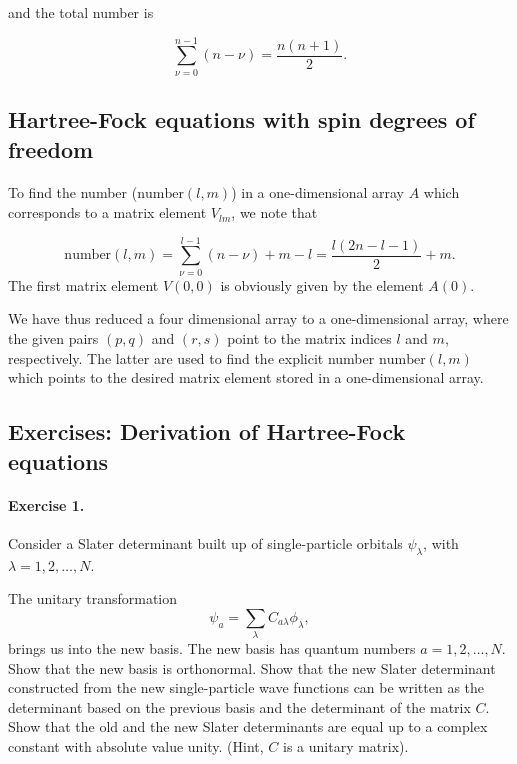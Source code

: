 \documentclass[%
twoside,                 %
final,                   %
10pt]{article}
\begin{document}
\noindent
and the total number is

\begin{equation*}
\sum_{\nu =0}^{n-1}\left(n-\nu\right)=\frac{n(n+1)}{2}.
\end{equation*}



\subsection{Hartree-Fock equations with spin degrees of freedom}

\paragraph{}

To find the number ($\mathrm{number}(l,m)$) in a one-dimensional array $A$ which corresponds to a matrix element $V_{lm}$, we note that

\begin{equation*}
\mathrm{number}(l,m)=\sum_{\nu =0}^{l-1}\left(n-\nu\right)+m-l=\frac{l(2n-l-1)}{2}+m.
\end{equation*}
The first matrix element $V(0,0)$ is obviously given by the element $A(0)$. 

We have thus reduced a four dimensional array to a one-dimensional array, where the given pairs $(p,q)$ and $(r,s)$ point to the matrix indices $l$
and $m$, respectively. The latter are used to find the explicit number $\mathrm{number}(l,m)$ which points to the desired matrix element stored 
in a one-dimensional array.



\subsection{Exercises: Derivation of Hartree-Fock equations}

\paragraph{Exercise 1.}
Consider a Slater determinant built up of single-particle orbitals $\psi_{\lambda}$, 
with $\lambda = 1,2,\dots,N$.

The unitary transformation
\[
\psi_a  = \sum_{\lambda} C_{a\lambda}\phi_{\lambda},
\]
brings us into the new basis.  
The new basis has quantum numbers $a=1,2,\dots,N$.
Show that the new basis is orthonormal.
Show that the new Slater determinant constructed from the new single-particle wave functions can be
written as the determinant based on the previous basis and the determinant of the matrix $C$.
Show that the old and the new Slater determinants are equal up to a complex constant with absolute value unity.
(Hint, $C$ is a unitary matrix).
\end{document}
